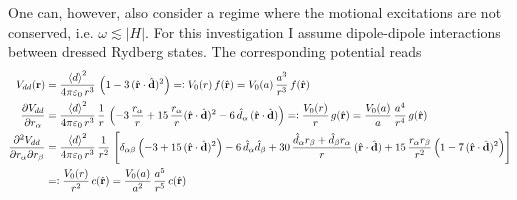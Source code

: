 One can, however, also consider a regime where the motional excitations are not conserved, i.e. $\omega\lesssim|H|$. For this investigation I assume dipole-dipole interactions between dressed Rydberg states. The corresponding potential reads
\begin{align*}
    V_{dd}(\mathbf{r}) &= \frac{\expval{d}^2}{4\pi\varepsilon_0\,r^3}\,\left(1-3\,(\hat{\mathbf{r}}\cdot \hat{\mathbf{d}})^2\right)=\vcentcolon V_0(r)\,f(\hat{\mathbf{r}})=V_0(a)\,\frac{a^3}{r^3}\,f(\hat{\mathbf{r}})\\
    \frac{\partial V_{dd}}{\partial r_\alpha} &=\frac{\expval{d}^2}{4\pi\varepsilon_0\,r^3}\,\frac1r\,\left( -3\,\frac{ r_\alpha}{r} + 15\,\frac{ r_\alpha }{r}(\hat{\mathbf{r}}\cdot \hat{\mathbf{d}})^2 - 6\,\hat{d}_\alpha\, (\hat{\mathbf{r}}\cdot \hat{\mathbf{d}}) \right)=\vcentcolon \frac{V_0(r)}{r}\,g(\hat{\mathbf{r}})=\frac{V_0(a)}{a}\,\frac{a^4}{r^4}\,g(\hat{\mathbf{r}})\\
    \frac{\partial^2 V_{dd}}{\partial r_\alpha \partial r_\beta}  &= \frac{\expval{d}^2}{4\pi\varepsilon_0\,r^3}\,\frac1{r^2}\,\left[\delta_{\alpha\beta}\left(-3 + 15\, (\hat{\mathbf{r}}\cdot \hat{\mathbf{d}})^2\right)- 6\,\hat{d}_\alpha \hat{d}_\beta +30\, \frac{\hat{d}_\alpha r_\beta + \hat{d}_\beta r_\alpha}{r}\,(\hat{\mathbf{r}}\cdot \hat{\mathbf{d}}) + 15\,\frac{r_\alpha r_\beta}{r^2} \left(1  - 7\, (\hat{\mathbf{r}}\cdot \hat{\mathbf{d}})^2\right)\right]\\
    &=\vcentcolon \frac{V_0(r)}{r^2}\,c(\hat{\mathbf{r}})=\frac{V_0(a)}{a^2}\,\frac{a^5}{r^5}\,c(\hat{\mathbf{r}})
\end{align*}
